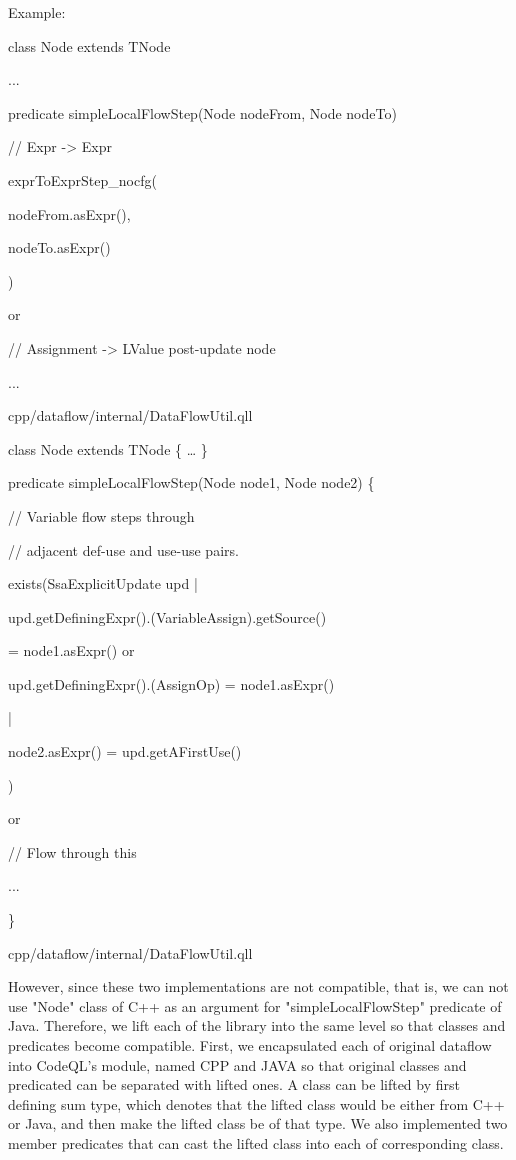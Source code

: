 Example:

class Node extends TNode {

  ...

}

predicate simpleLocalFlowStep(Node nodeFrom, Node nodeTo) {

  // Expr -> Expr
 
  exprToExprStep\_nocfg(
  
    nodeFrom.asExpr(),
    
    nodeTo.asExpr()
  
  )
  
  or
  
  // Assignment -> LValue post-update node
  
  ...

}

cpp/dataflow/internal/DataFlowUtil.qll

class Node extends TNode \{
   …
\}

predicate simpleLocalFlowStep(Node node1, Node node2) \{

  // Variable flow steps through
  
  // adjacent def-use and use-use pairs.
  
  exists(SsaExplicitUpdate upd |
  
    upd.getDefiningExpr().(VariableAssign).getSource()
    
    = node1.asExpr() or
    
    upd.getDefiningExpr().(AssignOp) = node1.asExpr()
  
  |
  
    node2.asExpr() = upd.getAFirstUse()
  
  )
  
  or
  
  // Flow through this
  
  ...

\}

cpp/dataflow/internal/DataFlowUtil.qll

However, since these two implementations are not compatible, that is,
we can not use "Node" class of C++ as an argument for "simpleLocalFlowStep" predicate of Java.
Therefore, we lift each of the library into the same level so that classes and predicates become compatible.
First, we encapsulated each of original dataflow into CodeQL's module, named CPP and JAVA so that
original classes and predicated can be separated with lifted ones.
A class can be lifted by first defining sum type, which denotes that the lifted class would be either from C++ or
Java, and then make the lifted class be of that type. We also implemented two member predicates that can cast
the lifted class into each of corresponding class.

